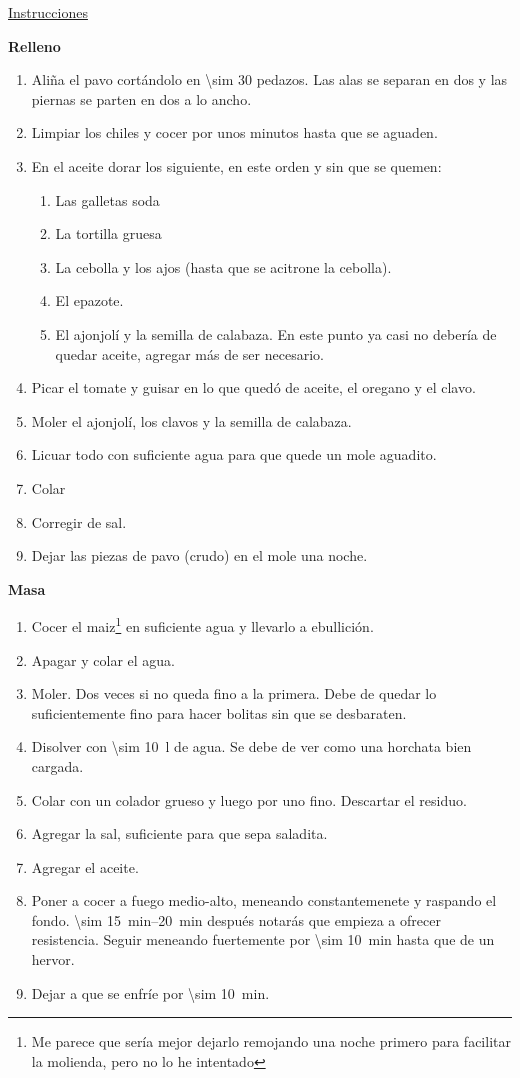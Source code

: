 \underline{Instrucciones}

\textbf{Relleno}
\begin{enumerate}
\item Aliña el pavo cortándolo en \num{\sim 30} pedazos. Las alas se separan en dos y las piernas se parten en dos a lo ancho. 
\item Limpiar los chiles y cocer por unos minutos hasta que se aguaden.
\item En el aceite dorar los siguiente, en este orden y sin que se quemen:
\begin{enumerate}
\item Las galletas soda
\item La tortilla gruesa
\item La cebolla y los ajos (hasta que se acitrone la cebolla).
\item El epazote.
\item El ajonjolí y la semilla de calabaza. En este punto ya casi no debería de quedar aceite, agregar más de ser necesario.
\end{enumerate}
\item Picar el tomate y guisar en lo que quedó de aceite, el oregano y el clavo.
\item Moler el ajonjolí, los clavos y la semilla de calabaza.
\item Licuar todo con suficiente agua para que quede un mole aguadito.
\item Colar
\item Corregir de sal.
\item Dejar las piezas de pavo (crudo) en el mole una noche.
\end{enumerate}

\textbf{Masa}
\begin{enumerate}
\item Cocer el maiz\footnote{Me parece que sería mejor dejarlo remojando una noche primero para facilitar la molienda, pero no lo he intentado} en suficiente agua y llevarlo a ebullición.
\item Apagar y colar el agua.
\item Moler. Dos veces si no queda fino a la primera. Debe de quedar lo suficientemente fino para hacer bolitas sin que se desbaraten. 
\item Disolver con \SI{\sim 10}{l} de agua. Se debe de ver como una horchata bien cargada.
\item Colar con un colador grueso y luego por uno fino. Descartar el residuo.
\item Agregar la sal, suficiente para que sepa saladita.
\item Agregar el aceite.
\item Poner a cocer a fuego medio-alto, meneando constantemenete y raspando el fondo. \SIrange{\sim 15}{20}{min} después notarás que empieza a ofrecer resistencia. Seguir meneando fuertemente por \SI{\sim 10}{min} hasta que de un hervor.
\item Dejar a que se enfríe por \SI{\sim 10}{min}.
\end{enumerate}

